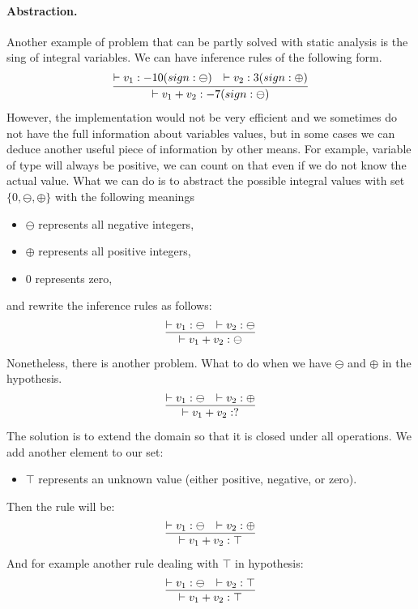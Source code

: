         \paragraph{Abstraction.}
        Another example of problem that can be partly solved with static analysis 
        is the sing of integral variables. We can have inference rules of the 
        following form.
        $$
        \infer{\vdash v_1+v_2 : -7 (sign: \ominus)}
        {\vdash v_1 : -10 (sign: \ominus) & \vdash v_2 : 3 (sign: \oplus)}
        $$
        However, the implementation would not be very efficient and we sometimes 
        do not have the full information about variables values, but in some cases 
        we can deduce another useful piece of information by other means. For example, variable of 
        type  will always be positive, we can count on that 
        even if we do not know the actual value. What we 
        can do is to abstract the possible integral values with set 
        $\{0, \ominus, \oplus\}$ with the following meanings         
        \begin{itemize}
            \item $\ominus$ represents all negative integers,
            \item $\oplus$ represents all positive integers,
            \item $0$ represents zero,
        \end{itemize}                
        and rewrite the inference rules as follows:
        $$
        \infer{\vdash v_1+v_2 : \ominus}
        {\vdash v_1 : \ominus & \vdash v_2 : \ominus}
        $$
        Nonetheless, there is another problem. What to do when we have $\ominus$ 
        and $\oplus$ in the hypothesis.
        $$
        \infer{\vdash v_1+v_2 : ?}
        {\vdash v_1 : \ominus & \vdash v_2 : \oplus}
        $$
        The solution is to extend the domain so that it is closed under all operations. 
        We add another element to our set:
        \begin{itemize}
            \item $\top$ represents an unknown value (either positive, negative, or zero).
        \end{itemize}
        Then the rule will be:
        $$
        \infer{\vdash v_1+v_2 : \top}
        {\vdash v_1 : \ominus & \vdash v_2 : \oplus}
        $$
        And for example another rule dealing with $\top$ in hypothesis:
        $$
        \infer{\vdash v_1+v_2 : \top}
        {\vdash v_1 : \ominus & \vdash v_2 : \top}
        $$               
    
